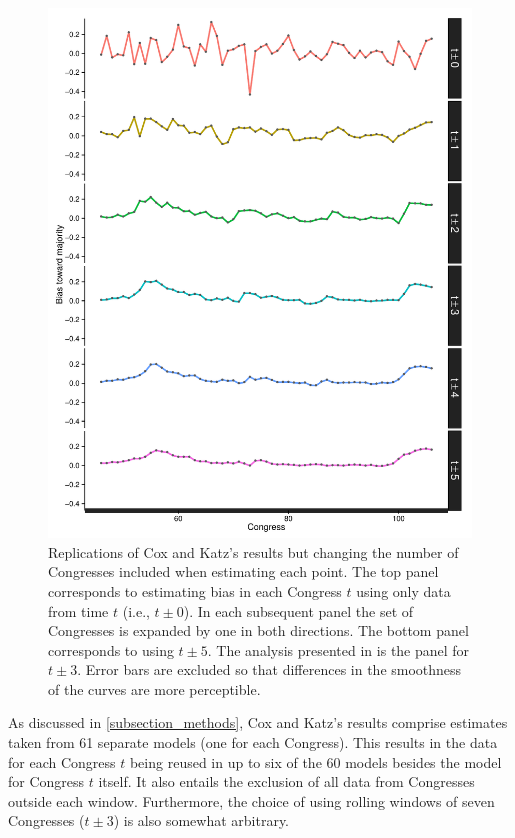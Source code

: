 \begin{figure}
\centering
\includegraphics[scale=0.75]{sections/figs/ck_hypothetical}
\caption{Replications of Cox and Katz's results but changing the number of Congresses included when estimating each point. The top panel corresponds to estimating bias in each Congress $t$ using only data from time $t$ (i.e., $t \pm 0$). In each subsequent panel the set of Congresses is expanded by one in both directions. The bottom panel corresponds to using $t \pm 5$. The analysis presented in \protect{} is the panel for $t \pm 3$. Error bars are excluded so that differences in the smoothness of the curves are more perceptible.}
\label{fig:ck_hypothetical}
\end{figure}

As discussed in \ref{subsection_methods}, Cox and Katz's results comprise estimates taken from 61 separate models (one for each Congress). This results in the data for each Congress $t$ being reused in up to six of the 60 models besides the model for Congress $t$ itself. It also entails the exclusion of all data from Congresses outside each window. Furthermore, the choice of using rolling windows of seven Congresses ($t \pm 3$) is also somewhat arbitrary. 

